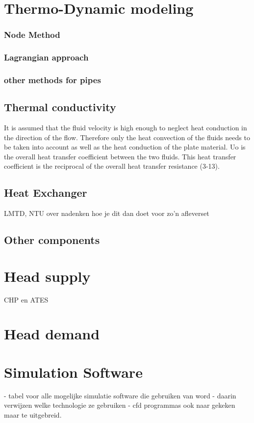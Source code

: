 \section{Thermo-Dynamic modeling}\label{sec::thermo}
\subsubsection{Node Method}
\subsubsection{Lagrangian approach}
\subsubsection{other methods for pipes}
\subsection{Thermal conductivity}
It is assumed that the fluid velocity is high enough to neglect heat conduction in the direction of the flow. Therefore only the heat convection of the fluids needs to be taken into account as well as the heat conduction of the plate material. Uo is the overall heat transfer coefficient between the two fluids. This heat transfer coefficient is the reciprocal of the overall heat transfer resistance (3-13). 
\subsection{Heat Exchanger}
LMTD, NTU
over nadenken hoe je dit dan doet voor zo'n afleverset
\subsection{Other components}

\section{Head supply}
CHP en ATES

\section{Head demand}


\section{Simulation Software}
- tabel voor alle mogelijke simulatie software die gebruiken van word
- daarin verwijzen welke technologie ze gebruiken
- cfd programmas ook naar gekeken maar te uitgebreid. 

